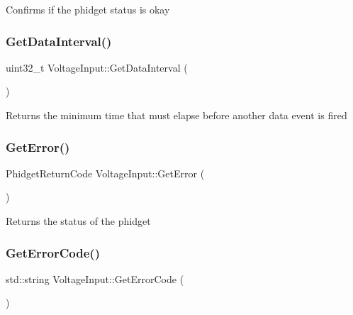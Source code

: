 Confirms if the phidget status is okay\mbox{\label{classVoltageInput_a95cb12ca2770091806097f91708881de}} 
\subsubsection{\texorpdfstring{Get\+Data\+Interval()}{GetDataInterval()}}
{\footnotesize\ttfamily uint32\+\_\+t Voltage\+Input\+::\+Get\+Data\+Interval (\begin{DoxyParamCaption}{ }\end{DoxyParamCaption})\hspace{0.3cm}{\ttfamily [inline]}}

Returns the minimum time that must elapse before another data event is fired\mbox{\label{classVoltageInput_ae5772543560e4c8f13e6743c7e89faaf}} 
\subsubsection{\texorpdfstring{Get\+Error()}{GetError()}}
{\footnotesize\ttfamily Phidget\+Return\+Code Voltage\+Input\+::\+Get\+Error (\begin{DoxyParamCaption}{ }\end{DoxyParamCaption})\hspace{0.3cm}{\ttfamily [inline]}}

Returns the status of the phidget\mbox{\label{classVoltageInput_a99ee65d7c9b71585b9da294fa8a571b3}} 
\subsubsection{\texorpdfstring{Get\+Error\+Code()}{GetErrorCode()}}
{\footnotesize\ttfamily std\+::string Voltage\+Input\+::\+Get\+Error\+Code (\begin{DoxyParamCaption}{ }\end{DoxyParamCaption})\hspace{0.3cm}{\ttfamily [inline]}}

